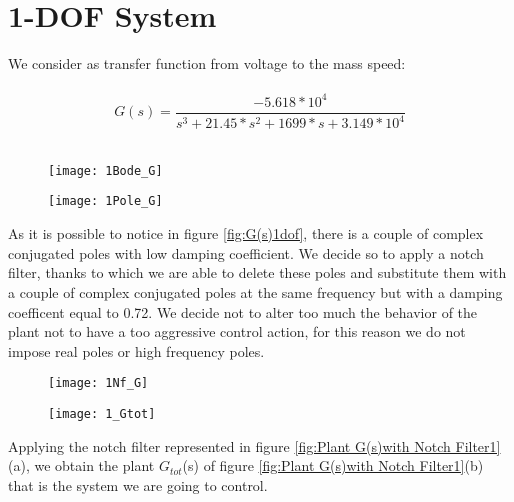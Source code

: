\section{1-DOF System}
We consider as transfer function from voltage to the mass speed:\\
\\
\[	
G(s)=
\frac{-5.618*10^{4}}{{s^3+21.45*s^{2}}+1699*s+3.149*10^{4}}
\]
\\


\begin{figure*}[h]
	\centering
	\begin{subfigure}{0.4\columnwidth}
		\texttt{[image: 1Bode\_G]}
	\end{subfigure}
	\begin{subfigure}{0.4\columnwidth}
		\texttt{[image: 1Pole\_G]}
	\end{subfigure}
	\caption{G(s)}
	\label{fig:G(s)1dof}
\end{figure*}

As it is possible to notice in figure \ref{fig:G(s)1dof}, there is a couple of complex conjugated poles with low damping coefficient. We decide so to apply a notch filter, thanks to which we are able to delete these poles and substitute them with a couple of complex conjugated poles at the same frequency but with a damping coefficent equal to 0.72. We decide not to alter too much the behavior of the plant not to have a too aggressive control action, for this reason we do not impose real poles or high frequency poles.

\begin{figure*}[h]
	\centering
	\begin{subfigure}{0.35\columnwidth}
		\texttt{[image: 1Nf\_G]}
	\end{subfigure}
	\begin{subfigure}{0.35\columnwidth}
		\texttt{[image: 1\_Gtot]}
	\end{subfigure}
	\caption{Plant G(s) with Notch Filter Nf(s): $G_{tot}$(s)}
	\label{fig:Plant G(s)with Notch Filter1}
\end{figure*}


Applying the notch filter represented in figure \ref{fig:Plant G(s)with Notch Filter1}(a), we obtain the plant $G_{tot}$(s) of figure \ref{fig:Plant G(s)with Notch Filter1}(b) that is the system we are going to control.



